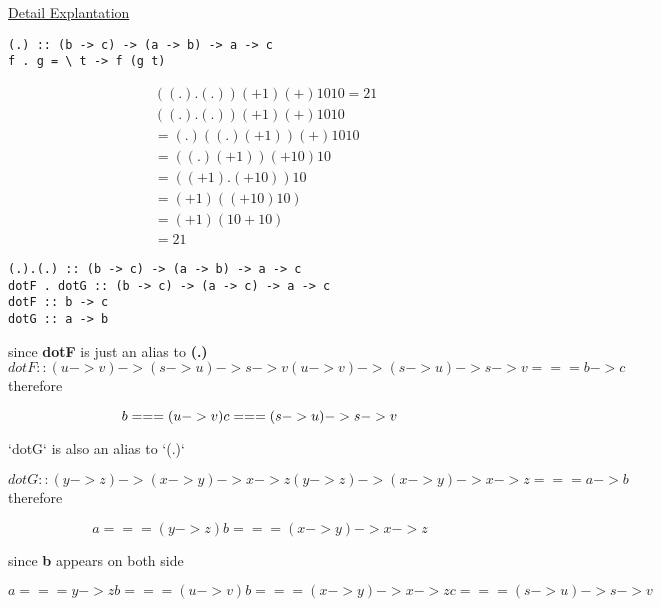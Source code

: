 \begin{WrapText}
\href{https://www.reddit.com/r/haskellquestions/comments/ayi445/help_me_understand_the_function_and_its_type}{Detail Explantation}

\begin{verbatim}
(.) :: (b -> c) -> (a -> b) -> a -> c
f . g = \ t -> f (g t)
\end{verbatim}


\begin{align*}
& ((.).(.)) (+1) (+) 10 10 = 21 \\
&  ((.).(.)) (+1) (+) 10 10 \\
& =  (.)((.) (+1)) (+) 10 10 \\
& =  ((.) (+1)) (+ 10) 10   \\
& = ((+1). (+10)) 10 \\
& = (+1) ((+10) 10) \\
& = (+1) (10 + 10) \\
& = 21
\end{align*}

\begin{verbatim}
(.).(.) :: (b -> c) -> (a -> b) -> a -> c
dotF . dotG :: (b -> c) -> (a -> c) -> a -> c
dotF :: b -> c
dotG :: a -> b
\end{verbatim}

since \textbf{dotF} is just an alias to  \textbf{(.)}
\begin{equation}
dotF :: (u -> v) -> (s -> u) -> s -> v
(u -> v) -> (s -> u) -> s -> v === b -> c
\end{equation}
therefore

\begin{equation}
b === (u -> v) \\
c === (s -> u) -> s -> v
\end{equation}

`dotG` is also an alias to `(.)`

\begin{equation}
dotG :: (y -> z) -> (x -> y) -> x -> z
(y -> z) -> (x -> y) -> x -> z === a -> b
\end{equation}
therefore

\begin{equation}
a === (y -> z)
b === (x -> y) -> x -> z
\end{equation}

since \textbf{b} appears on both side

\begin{equation}
a === y -> z
b === (u -> v)
b === (x -> y) -> x -> z
c === (s -> u) -> s -> v
\end{equation}


\end{WrapText}

